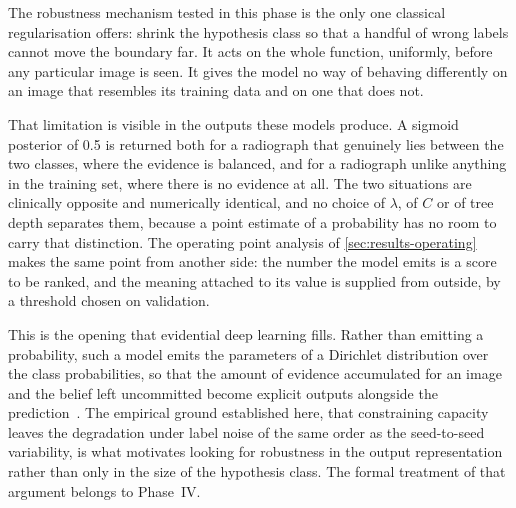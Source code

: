The robustness mechanism tested in this phase is the only one classical
regularisation offers: shrink the hypothesis class so that a handful of wrong
labels cannot move the boundary far. It acts on the whole function, uniformly,
before any particular image is seen. It gives the model no way of behaving
differently on an image that resembles its training data and on one that does
not.

That limitation is visible in the outputs these models produce. A sigmoid
posterior of \num{0.5} is returned both for a radiograph that genuinely lies
between the two classes, where the evidence is balanced, and for a radiograph
unlike anything in the training set, where there is no evidence at all. The two
situations are clinically opposite and numerically identical, and no choice of
$\lambda$, of $C$ or of tree depth separates them, because a point estimate of a
probability has no room to carry that distinction. The operating point analysis
of \cref{sec:results-operating} makes the same point from another side: the
number the model emits is a score to be ranked, and the meaning attached to its
value is supplied from outside, by a threshold chosen on validation.

This is the opening that evidential deep learning fills. Rather than emitting a
probability, such a model emits the parameters of a Dirichlet distribution over
the class probabilities, so that the amount of evidence accumulated for an image
and the belief left uncommitted become explicit outputs alongside the
prediction~\cite{sensoy2018evidential}. The empirical ground established here,
that constraining capacity leaves the degradation under label noise of the same
order as the seed-to-seed variability, is what motivates looking for robustness
in the output representation rather than only in the size of the hypothesis
class. The formal treatment of that argument belongs to Phase~IV.
